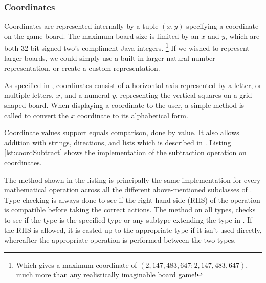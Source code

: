 \subsubsection{Coordinates}
Coordinates are represented internally by a tuple $(x, y)$ specifying a
coordinate on the game board. The maximum board size is limited by an $x$ and
$y$, which are both 32-bit signed two's compliment Java integers.
\footnote{Which gives a maximum coordinate of $(2,147,483,647; 2,147,483,647)$,
much more than any realistically imaginable board game!}
If we wished to represent larger boards, we could simply use a built-in larger
natural number representation, or create a custom representation.

As specified in , coordinates consist of
a horizontal axis represented by a letter, or multiple letters, $x$, and a
numeral $y$, representing the vertical squares on a grid-shaped board.
When displaying a coordinate to the user, a simple method is called to
convert the $x$ coordinate to its alphabetical form.

Coordinate values support equals comparison, done by value. It also allows
addition with strings, directions, and lists which is described in
. Listing \ref{lst:coordSubtract} shows the
implementation of the subtraction operation on coordinates.



The method shown in the listing is principally the same implementation for every
mathematical operation across all the different above-mentioned subclasses of
. Type checking is always done to see if the right-hand side
(RHS) of
the operation is compatible before taking the correct actions. The method
 on all  types, checks to see if the type is the
specified type or any subtype extending the type in \productname{}. If the RHS
is allowed, it is casted up to the appropriate type if it isn't used directly,
whereafter the appropriate operation is performed between the two types.

%


